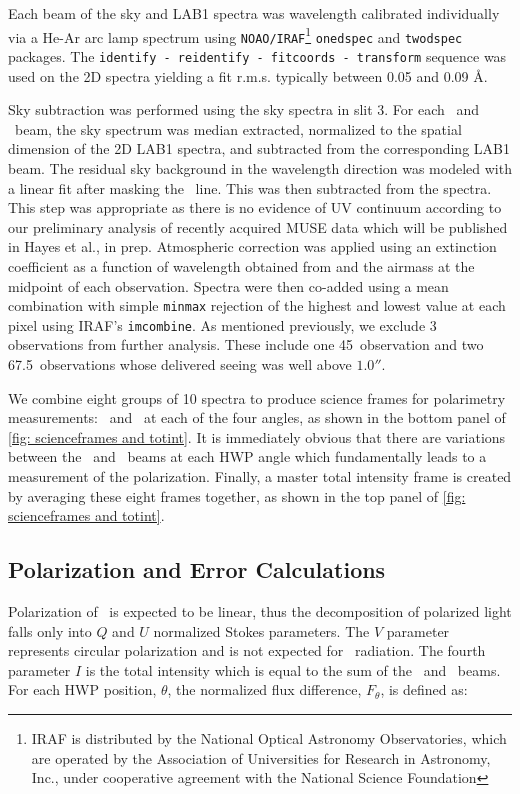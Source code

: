 Each beam of the sky and LAB1 spectra was wavelength calibrated individually via a He-Ar arc lamp spectrum using \texttt{NOAO/IRAF}\footnote{IRAF is distributed by the National Optical Astronomy Observatories, which are operated by the Association of Universities for Research in Astronomy, Inc., under cooperative agreement with the National Science Foundation} \texttt{onedspec} and \texttt{twodspec} packages. The \texttt{identify - reidentify - fitcoords - transform} sequence was used on the 2D spectra yielding a fit r.m.s. typically between 0.05 and 0.09 \AA.


Sky subtraction was performed using the sky spectra in slit 3. For each \ord~and \ext~beam, the sky spectrum was median extracted, normalized to the spatial dimension of the 2D LAB1 spectra, and subtracted from the corresponding LAB1 beam.  The residual sky background in the wavelength direction was modeled with a linear fit after masking the \lya~line. This was then subtracted from the spectra. This step was appropriate as there is no evidence of UV continuum according to our preliminary analysis of recently acquired MUSE data which will be published in Hayes et al., in prep. Atmospheric correction was applied using an extinction coefficient as a function of wavelength obtained from \cite{Patat2011} and the airmass at the midpoint of each observation. Spectra were then co-added using a mean combination with simple \texttt{minmax} rejection of the highest and lowest value at each pixel using IRAF's \texttt{imcombine}. As mentioned previously, we exclude 3 observations from further analysis. These include one 45\degs~observation and two 67.5\degs~observations whose delivered seeing was well above $1.0''$. 

We combine eight groups of 10 spectra to produce science frames for polarimetry measurements: \ord~and \ext~at each of the four angles, as shown in the bottom panel of \autoref{fig: scienceframes and totint}. It is immediately obvious that there are variations between the \ord~and \ext~beams at each HWP angle which fundamentally leads to a measurement of the polarization.  Finally, a master total intensity frame is created by averaging these eight frames together, as shown in the top panel of \autoref{fig: scienceframes and totint}.
 


\subsection{Polarization and Error Calculations}\label{sec:analysis}
Polarization of \lya~is expected to be linear, thus the decomposition of polarized light falls only into $Q$ and $U$ normalized Stokes parameters. The $V$ parameter represents circular polarization and is not expected for \lya ~radiation. The fourth parameter $I$ is the total intensity which is equal to the sum of the \ord~and \ext~beams.  For each HWP position, $\theta$, the normalized flux difference, $F_{\theta}$, is defined as:


